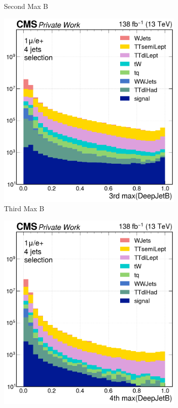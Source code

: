 \begin{figure}[H]
\begin{subfigure}{0.42\linewidth}
         \caption{Second Max \DeepJet B}
     \end{subfigure}
    \begin{subfigure}{0.42\linewidth}
         \includegraphics[width=\linewidth]{fig//chap07-selection/btag/Third_Max_DeepJetB.png}
         \caption{Third Max \DeepJet B}
     \end{subfigure}
    \begin{subfigure}{0.42\linewidth}
         \includegraphics[width=\linewidth]{fig//chap07-selection/btag/Fourth_Max_DeepJetB.png}

\end{subfigure}
\end{figure}
